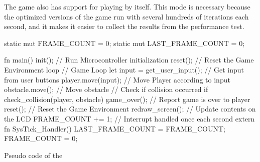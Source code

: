 The game also has support for playing by itself.
This mode is necessary because the optimized versions of the game run with several hundreds of iterations each second, and it makes it easier to collect the results from the performance test.

\begin{listing}[ht]
  \begin{rustcode}
static mut FRAME_COUNT = 0;
static mut LAST_FRAME_COUNT = 0;

fn main() {
  init();  // Run Microcontroller initialization
  reset(); // Reset the Game Environment
  loop {   // Game Loop
    let input = get_user_input(); // Get input from user buttons
    player.move(input);           // Move Player according to input
    obstacle.move();              // Move obstacle
    // Check if collision occurred
    if check_collision(player, obstacle) {
      game_over(); // Report game is over to player
      reset();     // Reset the Game Environment
    }
    redraw_screen(); // Update contents on the LCD
    FRAME_COUNT += 1;
  }
}
// Interrupt handled once each second
extern fn SysTick_Handler() {
  LAST_FRAME_COUNT = FRAME_COUNT;
  FRAME_COUNT = 0;
}
  \end{rustcode}
  \caption{Pseudo code of the {\cg}}
  \label{lst:game_loop}
\end{listing}
